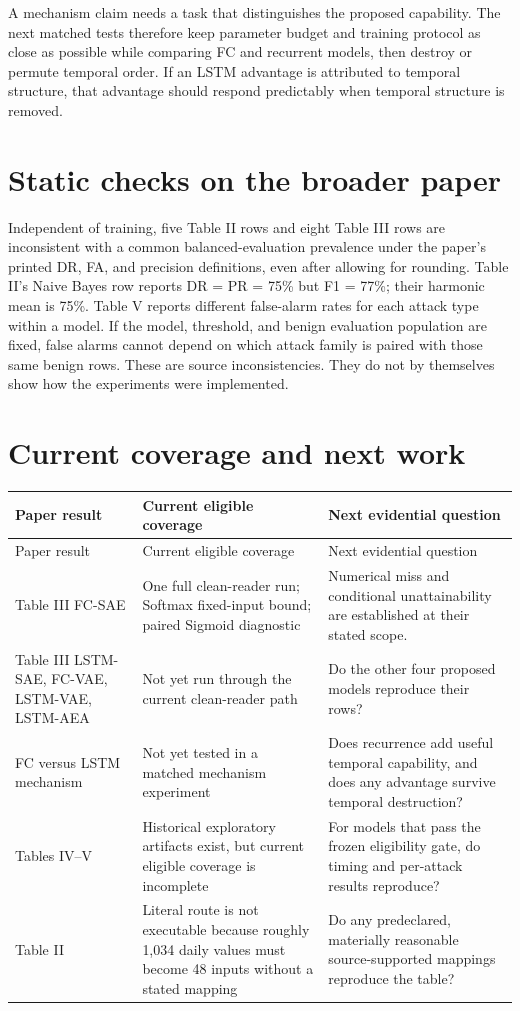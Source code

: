 \documentclass[11pt]{article}
\begin{document}
A mechanism claim needs a task that distinguishes the proposed capability.
The next matched tests therefore keep parameter budget and training protocol as
close as possible while comparing FC and recurrent models, then destroy or
permute temporal order. If an LSTM advantage is attributed to temporal
structure, that advantage should respond predictably when temporal structure
is removed.

\section{Static checks on the broader paper}

Independent of training, five Table II rows and eight Table III rows are
inconsistent with a common balanced-evaluation prevalence under the paper's
printed DR, FA, and precision definitions, even after allowing for rounding.
Table II's Naive Bayes row reports DR = PR = 75\% but F1 = 77\%; their harmonic
mean is 75\%. Table V reports different false-alarm rates for each attack type
within a model. If the model, threshold, and benign evaluation population are
fixed, false alarms cannot depend on which attack family is paired with those
same benign rows. These are source inconsistencies. They do not by themselves
show how the experiments were implemented.

\section{Current coverage and next work}

\begin{longtable}{L{0.23\textwidth}L{0.26\textwidth}L{0.42\textwidth}}
\toprule
Paper result & Current eligible coverage & Next evidential question \\
\midrule
\endfirsthead
\toprule
Paper result & Current eligible coverage & Next evidential question \\
\midrule
\endhead
Table III FC-SAE & One full clean-reader run; Softmax fixed-input bound;
paired Sigmoid diagnostic & Numerical miss and conditional unattainability are
established at their stated scope. \\
Table III LSTM-SAE, FC-VAE, LSTM-VAE, LSTM-AEA & Not yet run through the current
clean-reader path & Do the other four proposed models reproduce their rows? \\
FC versus LSTM mechanism & Not yet tested in a matched mechanism experiment &
Does recurrence add useful temporal capability, and does any advantage survive
temporal destruction? \\
Tables IV--V & Historical exploratory artifacts exist, but current eligible
coverage is incomplete & For models that pass the frozen eligibility gate, do
timing and per-attack results reproduce? \\
Table II & Literal route is not executable because roughly 1,034 daily values
must become 48 inputs without a stated mapping & Do any predeclared, materially
reasonable source-supported mappings reproduce the table? \\
\bottomrule
\end{longtable}
\end{document}
